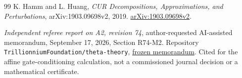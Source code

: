\begin{thebibliography}{99}
K. Hamm and L. Huang,
\emph{CUR Decompositions, Approximations, and Perturbations},
arXiv:1903.09698v2, 2019.
\href{https://arxiv.org/abs/1903.09698v2}{arXiv:1903.09698v2}.

\emph{Independent referee report on A2, revision 74},
author-requested AI-assisted memorandum, September 17, 2026,
Section R74-M2. Repository
\texttt{Trillionnium\allowbreak Foundation/\allowbreak theta-theory},
\href{https://github.com/TrillionniumFoundation/theta-theory/blob/1ad828fd3cec7d39881fa4bb31d14423c4fd35da/reviews/a2-v74-independent-harsh-top4-2026-09-17/REFEREE_REPORT.md}{frozen memorandum}.
Cited for the affine gate-conditioning calculation, not a commissioned
journal decision or a mathematical certificate.


\end{thebibliography}
